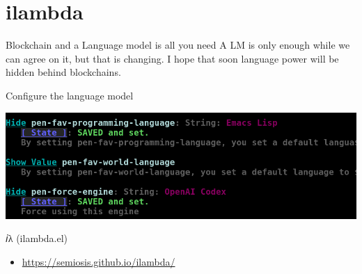 \documentclass[presentation]{beamer}
\begin{document}
\section{ilambda}
\label{sec:orge51b19c}
\begin{frame}[label={sec:org4cb918e}]{Blockchain and a Language model is all you need}
A LM is only enough while we can agree on it,
but that is changing. I hope that soon
language power will be hidden behind
blockchains.

\begin{block}{Configure the language model}
\begin{center}
\includegraphics[width=.9\linewidth]{./configure-model.png}
\end{center}
\end{block}

\begin{block}{𝑖λ (ilambda.el)}
\begin{itemize}
\item \url{https://semiosis.github.io/ilambda/}
\end{itemize}
\end{block}
\end{frame}
\end{document}
